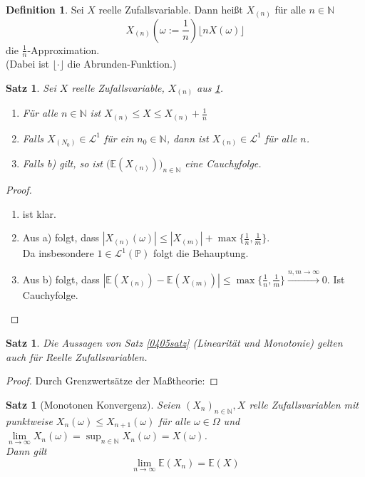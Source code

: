 \documentclass[10pt,a4paper]{article}
\newcommand{\N}{\ensuremath{\mathbb{N}}}
\newcommand{\Prb}{\mathbb P}
\newcommand{\Epv}{\ensuremath{\mathbb{E}}}
\newcommand{\scL}{\mathscr L}
\theoremstyle{plain}
\newtheorem{satz}[theorem]{Satz}
\theoremstyle{definition}
\newtheorem{definition}[theorem]{Definition}
\theoremstyle{remark}
\begin{document}
	\begin{definition}\label{0406def}
		Sei $X$ reelle Zufallsvariable. Dann heißt $X_{(n)}$ für alle $n\in\N$
		\[X_{(n)}(\omega:=\frac{1}{n})\lfloor nX(\omega)\rfloor\]
		die $\frac{1}{n}$-Approximation.\\
		(Dabei ist $\lfloor\cdot\rfloor$ die Abrunden-Funktion.)
	\end{definition}

	\begin{satz}\label{0407satz}
		Sei $X$ reelle Zufallsvariable, $X_{(n)}$ aus \ref{0406def}.
		\begin{enumerate}
			\item Für alle $n\in \N$ ist $X_{(n)}\leq X\leq X_{(n)}+\frac{1}{n}$
			\item Falls $X_(N_0)\in\scL^1$ für ein $n_0\in\N$, dann ist $X_{(n)}\in\scL^1$ für alle $n$.
			\item Falls b) gilt, so ist $\big(\Epv(X_{(n)})\big)_{n\in \N}$ eine Cauchyfolge.
		\end{enumerate}
	\end{satz}
	\begin{proof}$~$
		\begin{enumerate}
			\item ist klar.
			\item Aus a) folgt, dass $|X_{(n)}(\omega)|\leq |X_{(m)}|+\max\{\frac{1}{n},\frac{1}{m}\}$.\\
			Da insbesondere $1\in\scL^1(\Prb)$ folgt die Behauptung.
			\item Aus b) folgt, dass $|\Epv(X_{(n)})-\Epv(X_{(m)})|\leq\max\{\frac{1}{n},\frac{1}{m}\}\xrightarrow{n,m\to\infty}0$. Ist Cauchyfolge.
		\end{enumerate}
	\end{proof}

	\begin{satz}\label{0409satz}
		Die Aussagen von Satz \ref{0405satz} (Linearität und Monotonie) gelten auch für Reelle Zufallsvariablen.
	\end{satz}
	\begin{proof}
		Durch Grenzwertsätze der Maßtheorie:
	\end{proof}


	\begin{satz}[Monotonen Konvergenz]\label{0410monokonv}
		Seien $(X_n)_{n\in\N},X$ relle Zufallsvariablen mit punktweise $X_{n}(\omega)\leq X_{n+1}(\omega)$ für alle $\omega\in\Omega$ und $\lim\limits_{n\to\infty}X_n(\omega)=\sup_{n\in\N}X_n(\omega)=X(\omega)$.\\
		Dann gilt
		\[\lim\limits_{n\to\infty}\Epv(X_n)=\Epv(X)\]
	\end{satz}
\end{document}
